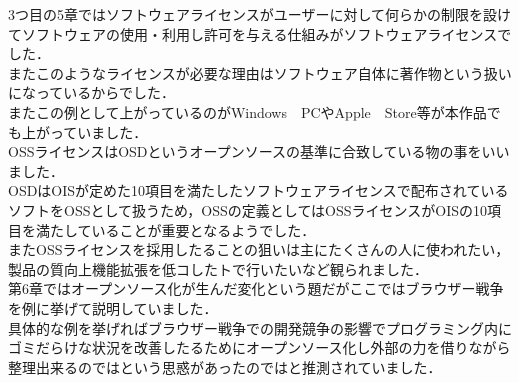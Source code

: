 \documentclass[uplatex,twocolumn,dvipdfmx]{jsarticle}
\begin{document}
3つ目の5章ではソフトウェアライセンスがユーザーに対して何らかの制限を設けてソフトウェアの使用・利用し許可を与える仕組みがソフトウェアライセンスでした．\\
またこのようなライセンスが必要な理由はソフトウェア自体に著作物という扱いになっているからでした．\\
またこの例として上がっているのがWindows　PCやApple　Store等が本作品でも上がっていました．\\
OSSライセンスはOSDというオープンソースの基準に合致している物の事をいいました．\\
OSDはOISが定めた10項目を満たしたソフトウェアライセンスで配布されているソフトをOSSとして扱うため，OSSの定義としてはOSSライセンスがOISの10項目を満たしていることが重要となるようでした．\\
またOSSライセンスを採用したることの狙いは主にたくさんの人に使われたい，製品の質向上機能拡張を低コしたトで行いたいなど観られました．\\
第6章ではオープンソース化が生んだ変化という題だがここではブラウザー戦争を例に挙げて説明していました．\\
具体的な例を挙げればブラウザー戦争での開発競争の影響でプログラミング内にゴミだらけな状況を改善したるためにオープンソース化し外部の力を借りながら整理出来るのではという思惑があったのではと推測されていました．\\




\end{document}
